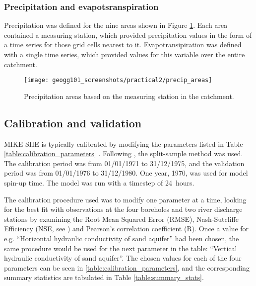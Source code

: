 \documentclass{article}
\begin{document}
\subsubsection{Precipitation and evapotsranspiration}

Precipitation was defined for the nine areas shown in Figure \ref{fig:precip_areas}. Each area contained a measuring station, which provided precipitation values in the form of a time series for those grid cells nearest to it. Evapotransipiration was defined with a single time series, which provided values for this variable over the entire catchment.

\begin{figure}[!h]
    \centering
    \texttt{[image: geogg101\_screenshots/practical2/precip\_areas]}
    \caption{Precipitation areas based on the measuring station in the catchment.}
    \label{fig:precip_areas}
\end{figure}



\subsection{Calibration and validation}
\label{sec:calibration}

MIKE SHE is typically calibrated by modifying the parameters listed in Table \ref{table:calibration_parameters} \parencite{refsgaard1997parameterisation, thompson2004simulation}. Following \textcite{klemevs1986operational}, the split-sample method was used. The calibration period was from 01/01/1971 to 31/12/1975, and the validation period was from 01/01/1976 to 31/12/1980. One year, 1970, was used for model spin-up time. The model was run with a timestep of \SI{24}{hours}.

The calibration procedure used was to modify one parameter at a time, looking for the best fit with observations at the four boreholes and two river discharge stations by examining the Root Mean Squared Error (RMSE), Nash-Sutcliffe Efficiency (NSE, see \textcite{nash1970river}) and Pearson's correlation coefficient (R). Once a value for e.g. ``Horizontal hydraulic conductivity of sand aquifer'' had been chosen, the same procedure would be used for the next parameter in the table: ``Vertical hydraulic conductivity of sand aquifer''. The chosen values for each of the four parameters can be seen in \ref{table:calibration_parameters}, and the corresponding summary statistics are tabulated in Table \ref{table:summary_stats}.
\end{document}

